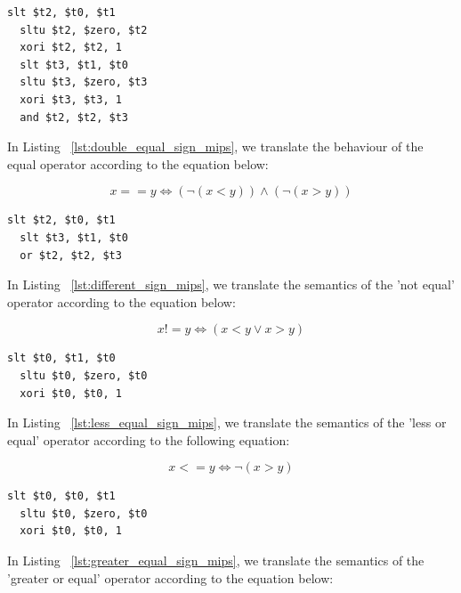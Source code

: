 \documentclass[
  oneside,
  11pt, a4paper,
  footinclude=true,
  headinclude=true,
  cleardoublepage=empty
]{scrbook}
\begin{document}
\begin{lstlisting}[caption={Code generated for 'equal' operator in MIPS},label={lst:double_equal_sign_mips}]
  slt $t2, $t0, $t1	
  sltu $t2, $zero, $t2	
  xori $t2, $t2, 1	
  slt $t3, $t1, $t0	
  sltu $t3, $zero, $t3
  xori $t3, $t3, 1	
  and $t2, $t2, $t3	
\end{lstlisting}

In Listing ~\ref{lst:double_equal_sign_mips}, we translate the behaviour of the equal operator according to the equation below:

\begin{equation}
  x == y \iff (\lnot (x < y)) \land (\lnot (x > y))
\end{equation}

\begin{lstlisting}[caption={Code generated for 'not equal' operator in MIPS},label={lst:different_sign_mips}]
  slt $t2, $t0, $t1	
  slt $t3, $t1, $t0	
  or $t2, $t2, $t3	
\end{lstlisting}

In Listing ~\ref{lst:different_sign_mips}, we translate the semantics of the 'not equal' operator according to the equation below:

\begin{equation}
  x != y \iff ( x < y \lor x > y)
\end{equation}

\begin{lstlisting}[caption={Code generated for 'less or equal' operator in MIPS},label={lst:less_equal_sign_mips}]
  slt $t0, $t1, $t0	
  sltu $t0, $zero, $t0	
  xori $t0, $t0, 1	
\end{lstlisting}

In Listing ~\ref{lst:less_equal_sign_mips}, we translate the semantics of the 'less or equal' operator according to the following equation:

\begin{equation}
  x <= y \iff \lnot ( x > y)
\end{equation}

\begin{lstlisting}[caption={Code generated for 'greater or equal' operator in MIPS},label={lst:greater_equal_sign_mips}]
  slt $t0, $t0, $t1	
  sltu $t0, $zero, $t0	
  xori $t0, $t0, 1	
\end{lstlisting}

In Listing ~\ref{lst:greater_equal_sign_mips}, we translate the semantics of the 'greater or equal' operator according to the equation below:
\end{document}

